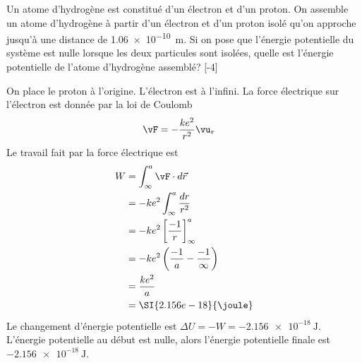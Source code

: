 \begin{diapobox}
  Un atome d'hydrogène est constitué d'un électron et d'un proton. On
  assemble un atome d'hydrogène à partir d'un électron et d'un proton isolé
  qu'on approche jusqu'à une distance de \SI{1.06e-10}{\meter}. Si on pose que
  l'énergie potentielle du système est nulle lorsque les deux particules sont
  isolées, quelle est l'énergie potentielle de l'atome d'hydrogène assemblé?
  [-4\baselineskip]
\end{diapobox}

\begin{reponsebox}
  On place le proton à l'origine. L'électron est à l'infini. La force
  électrique sur l'électron est donnée par la loi de Coulomb
  \begin{align*}
    \vF &= -\frac{ke^2}{r^2} \vu_r
  \end{align*}
  Le travail fait par la force électrique est
  \begin{align*}
    W &= \int_\infty^a \vF \cdot d\vec{r}  \\
      &= -ke^2 \int_\infty^a \frac{dr}{r^2} \\
      &= -ke^2 \left[ \frac{-1}{r} \right]_\infty^a  \\
      &= -ke^2 \left( \frac{-1}{a} - \frac{-1}{\infty} \right)  \\
      &= \frac{ke^2}{a}  \\
      &= \SI{2.156e-18}{\joule}
  \end{align*}
  Le changement d'énergie potentielle est $\Delta U = -W =
  -\SI{2.156e-18}{\joule}$. L'énergie potentielle au début est
  nulle, alors l'énergie potentielle finale est $-\SI{2.156e-18}{\joule}$.
\end{reponsebox}





